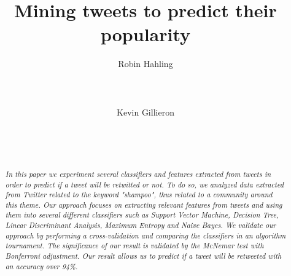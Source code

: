 \documentclass{sigchi}
\begin{document}
\title{Mining tweets to predict their popularity}

\author{
  \alignauthor Robin Hahling\\
    \\
    \\
    \\
  \alignauthor Kevin Gillieron\\
    \\
    \\
    \\
}

\maketitle

\begin{abstract}
\textit{
In this paper we experiment several classifiers and features extracted from
tweets in order to predict if a tweet will be retwitted or not.
To do so, we analyzed data extracted from Twitter related to the keyword
"shampoo", thus related to a community around this theme.
Our approach focuses on extracting relevant features from tweets and using them
into several different classifiers such as Support Vector Machine, Decision
Tree, Linear Discriminant Analysis, Maximum Entropy and Naive Bayes.
We validate our approach by performing a cross-validation and comparing the
classifiers in an algorithm tournament. The significance of our result is
validated by the McNemar test with Bonferroni adjustment.
Our result allows us to predict if a tweet will be retweeted with an accuracy 
over 94\%.
}
\end{abstract}








\end{document}
